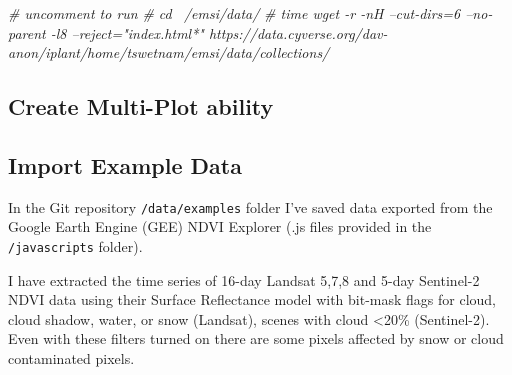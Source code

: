 \documentclass[
]{article}
\newenvironment{Shaded}{\begin{snugshade}}{\end{snugshade}}
\newcommand{\CommentTok}[1]{\textcolor[rgb]{0.56,0.35,0.01}{\textit{#1}}}
\begin{document}
\begin{Shaded}
\begin{Highlighting}[]
\CommentTok{# uncomment to run}
\CommentTok{# cd ~/emsi/data/}
\CommentTok{# time wget -r -nH --cut-dirs=6 --no-parent -l8 --reject="index.html*" https://data.cyverse.org/dav-anon/iplant/home/tswetnam/emsi/data/collections/}
\end{Highlighting}
\end{Shaded}

\hypertarget{create-multi-plot-ability}{%
\subsection{Create Multi-Plot ability}\label{create-multi-plot-ability}}

\hypertarget{import-example-data}{%
\subsection{Import Example Data}\label{import-example-data}}

In the Git repository \texttt{/data/examples} folder I've saved data
exported from the Google Earth Engine (GEE) NDVI Explorer (.js files
provided in the \texttt{/javascripts} folder).

I have extracted the time series of 16-day Landsat 5,7,8 and 5-day
Sentinel-2 NDVI data using their Surface Reflectance model with bit-mask
flags for cloud, cloud shadow, water, or snow (Landsat), scenes with
cloud \textless20\% (Sentinel-2). Even with these filters turned on
there are some pixels affected by snow or cloud contaminated pixels.
\end{document}

